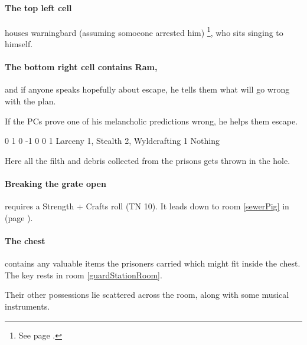 \begin{multicols}{2}
\begin{itemize}
\end{itemize}



\paragraph{The top left cell}
houses \gls{warningbard} (assuming somoeone arrested him)%
\footnote{See page \pageref{warningbard}.},
who sits singing to himself.

\paragraph{The bottom right cell contains Ram,}
and if anyone speaks hopefully about escape, he tells them what will go wrong with the plan.

If the PCs prove one of his melancholic predictions wrong, he helps them escape.

{0}%
{1}%
{{0}%
{-1}%
{0}}%
{0}%
{1}%
{Larceny 1, Stealth 2, Wyldcrafting 1}%
{Nothing}%
{}


Here all the filth and debris collected from the prisons gets thrown in the hole.

\paragraph{Breaking the grate open}
requires a Strength + Crafts roll (TN 10).
It leads down to room \ref{sewerPig} in \lowercase{} (page \pageref{sewerPig}).


\paragraph{The chest}
contains any valuable items the prisoners carried which might fit inside the chest.
The key rests in room \ref{guardStationRoom}.

Their other possessions lie scattered across the room, along with some musical instruments.



\end{multicols}

